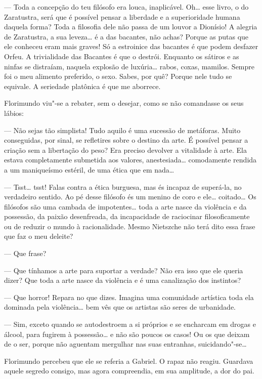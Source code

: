 --- Toda a concepção do teu filósofo era louca, inaplicável. Oh\ldots{} esse
livro, o do Zaratustra, será que é possível pensar a liberdade e a
superioridade humana daquela forma? Toda a filosofia dele não passa de
um louvor a Dionísio! A alegria de Zaratustra, a sua leveza\ldots{} é a das
bacantes, não achas? Porque as putas que ele conheceu eram mais graves!
Só a estroinice das bacantes é que podem desfazer Orfeu. A trivialidade
das Bacantes é que o destrói. Enquanto os sátiros e as ninfas se
distraíam, naquela explosão de luxúria\ldots{} rabos, coxas, mamilos. Sempre
foi o meu alimento preferido, o sexo. Sabes, por quê? Porque nele tudo se
equivale. A seriedade platônica é que me aborrece.

Florimundo viu"-se a rebater, sem o desejar, como se não comandasse os
seus lábios:

--- Não sejas tão simplista! Tudo aquilo é uma sucessão de metáforas.
Muito conseguidas, por sinal, se refletires sobre o destino da arte. É
possível pensar a criação sem a libertação do peso? Era preciso devolver
a vitalidade à arte. Ela estava completamente submetida aos valores,
anestesiada\ldots{} comodamente rendida a um maniqueísmo estéril, de uma
ética que em nada\ldots{}

--- Tsst\ldots{} tsst! Falas contra a ética burguesa, mas és incapaz de
superá-la, no verdadeiro sentido. Ao pé desse filósofo és um menino de
coro e ele\ldots{} coitado\ldots{} Os filósofos são uma cambada de
impotentes\ldots{} toda a arte nasce da violência e da possessão, da paixão
desenfreada, da incapacidade de raciocinar filosoficamente ou de reduzir
o mundo à racionalidade. Mesmo Nietszche não terá dito essa frase que
faz o meu deleite?

--- Que frase?

--- Que tínhamos a arte para suportar a verdade? Não era isso que ele
queria dizer? Que toda a arte nasce da violência e é uma canalização dos
instintos?

--- Que horror! Repara no que dizes. Imagina uma comunidade artística toda
ela dominada pela violência\ldots{} bem vês que os artistas são seres de
urbanidade.

--- Sim, exceto quando se autodestroem a si próprios e se encharcam em
drogas e álcool, para fugirem à possessão\ldots{} e não são poucos os casos!
Ou os que deixam de o ser, porque não aguentam mergulhar nas suas
entranhas, suicidando"-se\ldots{}

Florimundo percebeu que ele se referia a Gabriel. O rapaz não reagiu.
Guardava aquele segredo consigo, mas agora compreendia, em sua
amplitude, a dor do pai.

